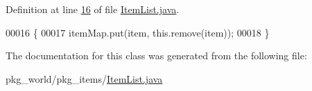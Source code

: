 Definition at line \hyperlink{ItemList_8java_source_l00016}{16} of file \hyperlink{ItemList_8java_source}{Item\-List.\-java}.


\begin{DoxyCode}
00016                                                                      \{
00017         itemMap.put(item, this.remove(item));
00018     \}
\end{DoxyCode}


The documentation for this class was generated from the following file\-:\begin{DoxyCompactItemize}
\item 
pkg\-\_\-world/pkg\-\_\-items/\hyperlink{ItemList_8java}{Item\-List.\-java}\end{DoxyCompactItemize}
